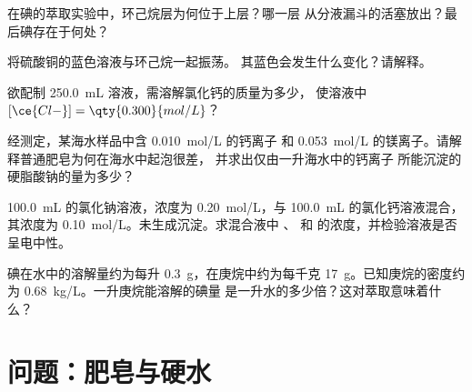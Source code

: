 \begin{exercise}[$\star\star$]\label{exo:g11:dissolution:10}
在碘的萃取实验中，环己烷层为何位于上层？哪一层
从分液漏斗的活塞放出？最后碘存在于何处？
\end{exercise}

\begin{exercise}[$\star\star$]\label{exo:g11:dissolution:11}
将硫酸铜的蓝色溶液与环己烷一起振荡。
其蓝色会发生什么变化？请解释。
\end{exercise}

\begin{exercise}[$\star\star\star$]\label{exo:g11:dissolution:12}
欲配制 \qty{250.0}{mL} 溶液，需溶解氯化钙的质量为多少，
使溶液中 $[\ce{Cl-}] = \qty{0.300}{mol/L}$？
\end{exercise}

\begin{exercise}[$\star\star\star$]\label{exo:g11:dissolution:13}
经测定，某海水样品中含 \qty{0.010}{mol/L} 的钙离子
和 \qty{0.053}{mol/L} 的镁离子。请解释普通肥皂为何在海水中起泡很差，
并求出仅由一升海水中的钙离子
所能沉淀的硬脂酸钠的量为多少？
\end{exercise}

\begin{exercise}[$\star\star\star$]\label{exo:g11:dissolution:14}
\qty{100.0}{mL} 的氯化钠溶液，浓度为
\qty{0.20}{mol/L}，与 \qty{100.0}{mL} 的氯化钙溶液混合，
其浓度为 \qty{0.10}{mol/L}。未生成沉淀。求混合液中
、 和  的浓度，并检验溶液是否
呈电中性。
\end{exercise}

\begin{exercise}[$\star\star\star$]\label{exo:g11:dissolution:15}
碘在水中的溶解量约为每升 \qty{0.3}{g}，在庚烷中约为每千克
\qty{17}{g}。已知庚烷的密度约为
\qty{0.68}{kg/L}。一升庚烷能溶解的碘量
是一升水的多少倍？这对萃取意味着什么？
\end{exercise}

\section{问题：肥皂与硬水}

